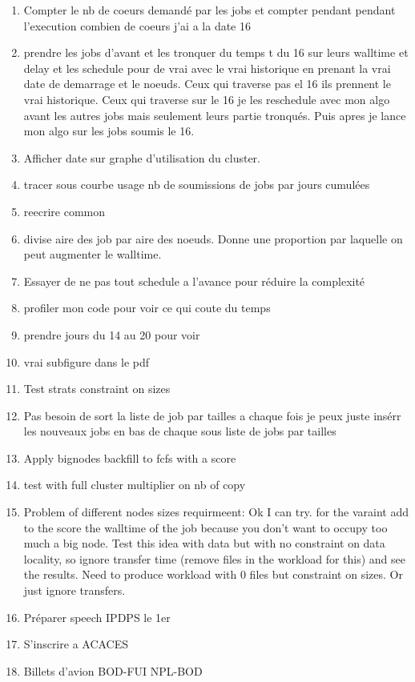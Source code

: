 \documentclass[a4paper]{article}
\begin{document}
\begin{enumerate}
			\item Compter le nb de coeurs demandé par les jobs et compter pendant pendant l'execution combien de coeurs j'ai a la date 16
			\item prendre les jobs d'avant et les tronquer du temps t du 16 sur leurs walltime et delay et les schedule pour de vrai avec le vrai historique en prenant la vrai date de demarrage et le noeuds. Ceux qui traverse pas el 16 ils prennent le vrai historique. Ceux qui traverse sur le 16 je les reschedule avec mon algo avant les autres jobs mais seulement leurs partie tronqués. Puis apres je lance mon algo sur les jobs soumis le 16.
			\item Afficher date sur graphe d'utilisation du cluster.
			\item tracer sous courbe usage nb de soumissions de jobs par jours cumulées
			\item reecrire common
			\item divise aire des job par aire des noeuds. Donne une proportion par laquelle on peut augmenter le walltime.
			\item Essayer de ne pas tout schedule a l'avance pour réduire la complexité
			\item profiler mon code pour voir ce qui coute du temps
			\item prendre jours du 14 au 20 pour voir
			\item vrai subfigure dans le pdf
			\item Test strats constraint on sizes
			\item Pas besoin de sort la liste de job par tailles a chaque fois je peux juste insérr les nouveaux jobs en bas de chaque sous liste de jobs par tailles
			\item Apply bignodes backfill to fcfs with a score
			\item test with full cluster multiplier on nb of copy
			\item Problem of different nodes sizes requirmeent: Ok I can try. for the varaint add to the score the walltime of the job because you don't want to occupy too much a big node. Test this idea with data but with no constraint on data locality, so ignore transfer time (remove files in the workload for this) and see the results. Need to produce workload with 0 files but constraint on sizes. Or just ignore transfers.
			\item Préparer speech IPDPS le 1er
			\item S'inscrire a ACACES
			\item Billets d'avion BOD-FUI NPL-BOD

\end{enumerate}
\end{document}
